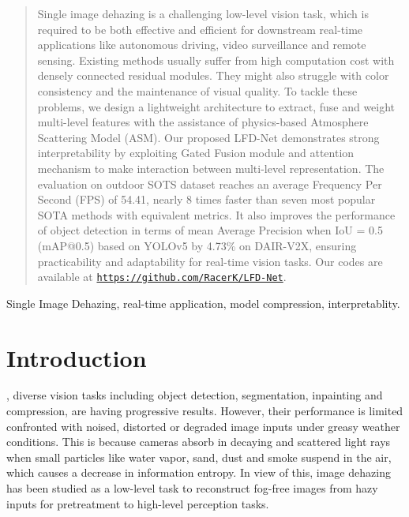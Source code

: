 \documentclass[lettersize,journal]{IEEEtran}
\begin{document}
\begin{abstract}
Single image dehazing is a challenging low-level vision task, which is required to be both effective and efficient for downstream real-time applications like autonomous driving, video surveillance and remote sensing. Existing methods usually suffer from high computation cost with densely connected residual modules. They might also struggle with color consistency and the maintenance of visual quality. To tackle these problems, we design a lightweight architecture to extract, fuse and weight multi-level features with the assistance of physics-based Atmosphere Scattering Model (ASM). Our proposed LFD-Net demonstrates strong interpretability by exploiting Gated Fusion module and attention mechanism to make interaction between multi-level representation. The evaluation on outdoor SOTS dataset reaches an average Frequency Per Second (FPS) of 54.41, nearly 8 times faster than seven most popular SOTA methods with equivalent metrics. It also improves the performance of object detection in terms of mean Average Precision when IoU = 0.5 (mAP@0.5) based on YOLOv5 by 4.73\% on DAIR-V2X, ensuring practicability and adaptability for real-time vision tasks. Our codes are available at {\color[HTML]{DD00DD} \texttt{\url{https://github.com/RacerK/LFD-Net}}}.
\end{abstract}

\begin{IEEEkeywords}
Single Image Dehazing, real-time application, model compression, interpretablity.
\end{IEEEkeywords}

\section{Introduction}
, diverse vision tasks including object detection, segmentation, inpainting and compression, are having progressive results. However, their performance is limited confronted with noised, distorted or degraded image inputs under greasy weather conditions. This is because cameras absorb in decaying and scattered light rays when small particles like water vapor, sand, dust and smoke suspend in the air, which causes a decrease in information entropy\cite{makarau2014haze, zheng2022dehaze, han2021edge}. In view of this, image dehazing has been studied as a low-level task to reconstruct fog-free images from hazy inputs for pretreatment to high-level perception tasks.
\end{document}
